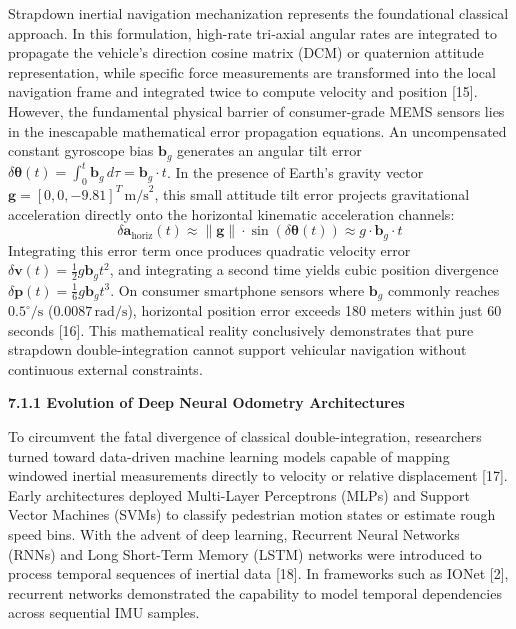\documentclass[11pt,a4paper]{article}
\begin{document}
Strapdown inertial navigation mechanization represents the foundational classical approach. In this formulation, high-rate tri-axial angular rates are integrated to propagate the vehicle's direction cosine matrix (DCM) or quaternion attitude representation, while specific force measurements are transformed into the local navigation frame and integrated twice to compute velocity and position [15]. However, the fundamental physical barrier of consumer-grade MEMS sensors lies in the inescapable mathematical error propagation equations. An uncompensated constant gyroscope bias $\mathbf{b}_g$ generates an angular tilt error $\delta\boldsymbol{\theta}(t) = \int_0^t \mathbf{b}_g \, d\tau = \mathbf{b}_g \cdot t$. In the presence of Earth's gravity vector $\mathbf{g} = [0, 0, -9.81]^T\,\text{m/s}^2$, this small attitude tilt error projects gravitational acceleration directly onto the horizontal kinematic acceleration channels:
\begin{equation}
\delta\mathbf{a}_{\text{horiz}}(t) \approx \|\mathbf{g}\| \cdot \sin(\delta\boldsymbol{\theta}(t)) \approx g \cdot \mathbf{b}_g \cdot t
\end{equation}
Integrating this error term once produces quadratic velocity error $\delta\mathbf{v}(t) = \frac{1}{2} g \mathbf{b}_g t^2$, and integrating a second time yields cubic position divergence $\delta\mathbf{p}(t) = \frac{1}{6} g \mathbf{b}_g t^3$. On consumer smartphone sensors where $\mathbf{b}_g$ commonly reaches $0.5^\circ/\text{s}$ ($0.0087\,\text{rad/s}$), horizontal position error exceeds 180 meters within just 60 seconds [16]. This mathematical reality conclusively demonstrates that pure strapdown double-integration cannot support vehicular navigation without continuous external constraints.
\newpage

\textbf{7.1.1 Evolution of Deep Neural Odometry Architectures}

To circumvent the fatal divergence of classical double-integration, researchers turned toward data-driven machine learning models capable of mapping windowed inertial measurements directly to velocity or relative displacement [17]. Early architectures deployed Multi-Layer Perceptrons (MLPs) and Support Vector Machines (SVMs) to classify pedestrian motion states or estimate rough speed bins. With the advent of deep learning, Recurrent Neural Networks (RNNs) and Long Short-Term Memory (LSTM) networks were introduced to process temporal sequences of inertial data [18]. In frameworks such as IONet [2], recurrent networks demonstrated the capability to model temporal dependencies across sequential IMU samples.
\end{document}
